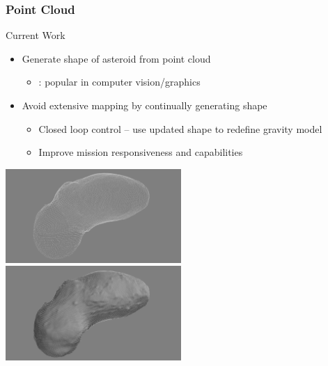 \subsubsection{Point Cloud}
\begin{frame}{Current Work}
    \begin{itemize}
        \item Generate shape of asteroid from point cloud 
            \begin{itemize}
                \item {}: popular in computer vision/graphics 
            \end{itemize}
        \item Avoid extensive mapping by continually generating shape
            \begin{itemize}
                \item Closed loop control -- use updated shape to redefine gravity model  
                \item Improve mission responsiveness and capabilities
            \end{itemize}
    \end{itemize}

    \begin{center}
        \includegraphics[width=0.5\textwidth]{figures/point_cloud/point_cloud_itokawa.png}~
        \includegraphics[width=0.5\textwidth]{figures/point_cloud/surface_itokawa.png}
    \end{center}
\end{frame}
